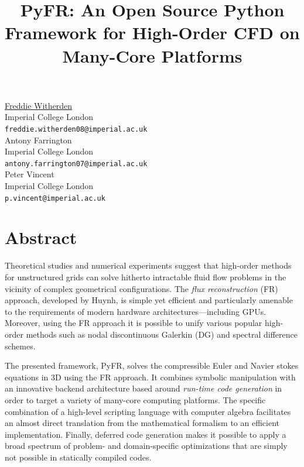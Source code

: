 \documentclass[article, A4, 11pt]{llncs}%
\begin{document}
\title{PyFR: An Open Source Python Framework for High-Order CFD on Many-Core Platforms}
 \author{} \institute{}
\maketitle
\begin{center}
{\large \underline{Freddie Witherden}}\\
Imperial College London\\
{\tt freddie.witherden08@imperial.ac.uk}
\\ \vspace{4mm}
{\large Antony Farrington}\\
Imperial College London\\
{\tt antony.farrington07@imperial.ac.uk}
\\ \vspace{4mm}
{\large Peter Vincent}\\
Imperial College London\\
{\tt p.vincent@imperial.ac.uk}
\end{center}

\section*{Abstract}
Theoretical studies and numerical experiments suggest that high-order methods for unstructured grids can solve hitherto intractable fluid flow problems in the vicinity of complex geometrical configurations. The \emph{flux reconstruction} (FR) approach, developed by Huynh, is simple yet efficient and particularly amenable to the requirements of modern hardware architectures---including GPUs. Moreover, using the FR approach it is possible to unify various popular high-order methods such as nodal discontinuous Galerkin (DG) and spectral difference schemes.

The presented framework, PyFR, solves the compressible Euler and Navier stokes equations in 3D using the FR approach. It combines symbolic manipulation with an innovative backend architecture based around \emph{run-time code generation} in order to target a variety of many-core computing platforms. The specific combination of a high-level scripting language with computer algebra facilitates an almost direct translation from the mathematical formalism to an efficient implementation. Finally, deferred code generation makes it possible to apply a broad spectrum of problem- and domain-specific optimizations that are simply not possible in statically compiled codes.
\end{document}

